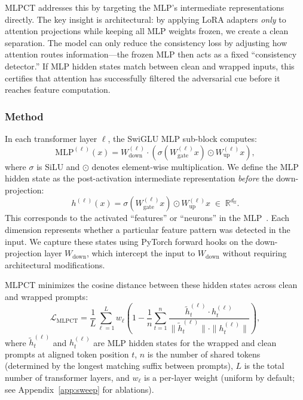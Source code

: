 MLPCT addresses this by targeting the MLP's intermediate representations directly. The key insight is architectural: by applying LoRA adapters \emph{only} to attention projections while keeping all MLP weights frozen, we create a clean separation. The model can only reduce the consistency loss by adjusting how attention routes information---the frozen MLP then acts as a fixed ``consistency detector.'' If MLP hidden states match between clean and wrapped inputs, this certifies that attention has successfully filtered the adversarial cue before it reaches feature computation.

\subsubsection{Method}

In each transformer layer $\ell$, the SwiGLU MLP sub-block computes:
\begin{equation}
    \text{MLP}^{(\ell)}(x) = W_{\text{down}}^{(\ell)} \cdot \left( \sigma\!\left(W_{\text{gate}}^{(\ell)} x\right) \odot W_{\text{up}}^{(\ell)} x \right),
\end{equation}
where $\sigma$ is SiLU and $\odot$ denotes element-wise multiplication. We define the MLP hidden state as the post-activation intermediate representation \emph{before} the down-projection:
\begin{equation}
    h^{(\ell)}(x) = \sigma\!\left(W_{\text{gate}}^{(\ell)} x\right) \odot W_{\text{up}}^{(\ell)} x \;\in\; \mathbb{R}^{d_{\text{ff}}}.
\end{equation}
This corresponds to the activated ``features'' or ``neurons'' in the MLP~\citep{geva2021transformer}. Each dimension represents whether a particular feature pattern was detected in the input. We capture these states using PyTorch forward hooks on the down-projection layer $W_{\text{down}}$, which intercept the input to $W_{\text{down}}$ without requiring architectural modifications.

MLPCT minimizes the cosine distance between these hidden states across clean and wrapped prompts:
\begin{equation}
    \mathcal{L}_{\text{MLPCT}} = \frac{1}{L} \sum_{\ell=1}^{L} w_\ell \left( 1 - \frac{1}{n} \sum_{t=1}^{n} \frac{\tilde{h}^{(\ell)}_t \cdot h^{(\ell)}_t}{\|\tilde{h}^{(\ell)}_t\| \cdot \|h^{(\ell)}_t\|} \right),
    \label{eq:mlpct}
\end{equation}
where $\tilde{h}^{(\ell)}_t$ and $h^{(\ell)}_t$ are MLP hidden states for the wrapped and clean prompts at aligned token position $t$, $n$ is the number of shared tokens (determined by the longest matching suffix between prompts), $L$ is the total number of transformer layers, and $w_\ell$ is a per-layer weight (uniform by default; see Appendix~\ref{app:sweep} for ablations).

